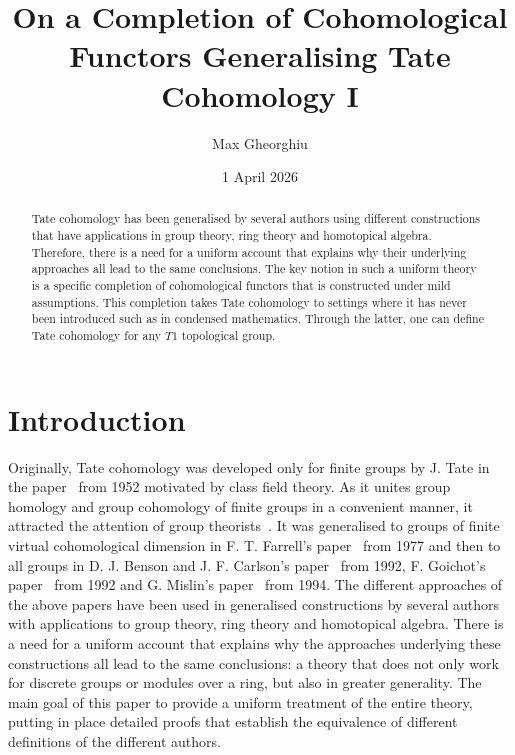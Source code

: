 \documentclass[12pt,a4paper]{article}
\title{On a Completion of Cohomological Functors Generalising Tate Cohomology I}
\date{1 April 2026}
\author{Max Gheorghiu}
\numberwithin{equation}{section}
\theoremstyle{nonumberplain}
\begin{document}
\setlength{\parindent}{0cm}

\maketitle

\begin{abstract}
Tate cohomology has been generalised by several authors using different constructions that have applications in group theory, ring theory and homotopical algebra. Therefore, there is a need for a uniform account that explains why their underlying approaches all lead to the same conclusions. The key notion in such a uniform theory is a specific completion of cohomological functors that is constructed under mild assumptions. This completion takes Tate cohomology to settings where it has never been introduced such as in condensed mathematics. Through the latter, one can define Tate cohomology for any $T1$ topological group.
\end{abstract}

\tableofcontents

\section{Introduction}\label{sec:intro}

Originally, Tate cohomology was developed only for finite groups by J.\! Tate in the paper~\cite{tat52} from 1952 motivated by class field theory. As it unites group homology and group cohomology of finite groups in a convenient manner, it attracted the attention of group theorists~\cite[p.~128]{bro82}. It was generalised to groups of finite virtual cohomological dimension in F.\! T.\! Farrell's paper~\cite{far77} from 1977 and then to all groups in D.\! J.\! Benson and J.\! F.\! Carlson's paper~\cite{ben92} from 1992, F.\! Goichot's paper~\cite{goi92} from 1992 and G.\! Mislin's paper~\cite{mis94} from 1994. The different approaches of the above papers have been used in generalised constructions by several authors with applications to group theory, ring theory and homotopical algebra. There is a need for a uniform account that explains why the approaches underlying these constructions all lead to the same conclusions: a theory that does not only work for discrete groups or modules over a ring, but also in greater generality. The main goal of this paper to provide a uniform treatment of the entire theory, putting in place detailed proofs that establish the equivalence of different definitions of the different authors. \\
\end{document}
